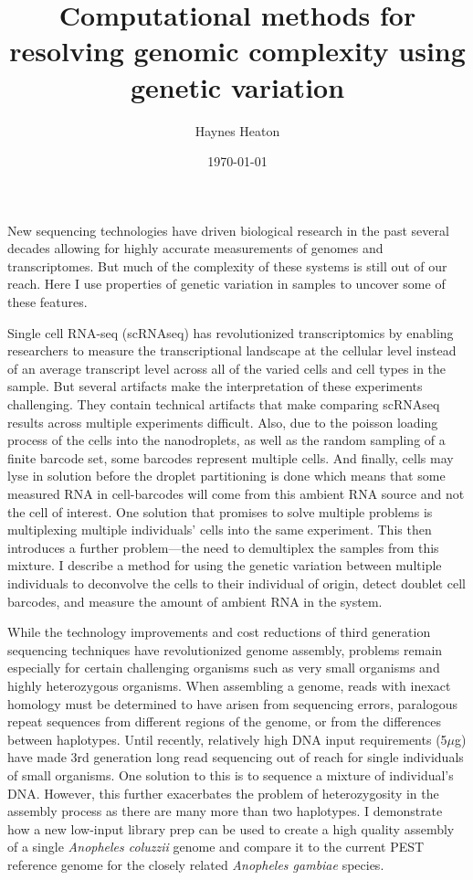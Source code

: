\documentclass[11pt]{article}
\title{Computational methods for resolving genomic complexity using genetic variation}
\author{
        Haynes Heaton
}
\date{\today}
\begin{document}
\maketitle

\par{
New sequencing technologies have driven biological research in the past several decades allowing for highly accurate measurements of genomes and transcriptomes. But much of the complexity of these systems is still out of our reach. Here I use properties of genetic variation in samples to uncover some of these features.
} 
\par{
Single cell RNA-seq (scRNAseq) has revolutionized transcriptomics by enabling researchers to measure the transcriptional landscape at the cellular level instead of an average transcript level across all of the varied cells and cell types in the sample. But several artifacts make the interpretation of these experiments challenging. They contain technical artifacts that make comparing scRNAseq results across multiple experiments difficult. Also, due to the poisson loading process of the cells into the nanodroplets, as well as the random sampling of a finite barcode set, some barcodes represent multiple cells. And finally, cells may lyse in solution before the droplet partitioning is done which means that some measured RNA in cell-barcodes will come from this ambient RNA source and not the cell of interest. One solution that promises to solve multiple problems is multiplexing multiple individuals' cells into the same experiment. This then introduces a further problem---the need to demultiplex the samples from this mixture. I describe a method for using the genetic variation between multiple individuals to deconvolve the cells to their individual of origin, detect doublet cell barcodes, and measure the amount of ambient RNA in the system. 

}
\par{
While the technology improvements and cost reductions of third generation sequencing techniques have revolutionized genome assembly, problems remain especially for certain challenging organisms such as very small organisms and highly heterozygous organisms. When assembling a genome, reads with inexact homology must be determined to have arisen from sequencing errors, paralogous repeat sequences from different regions of the genome, or from the differences between haplotypes. Until recently, relatively high DNA input requirements (5$\mu$g) have made 3rd generation long read sequencing out of reach for single individuals of small organisms. One solution to this is to sequence a mixture of individual's DNA. However, this further exacerbates the problem of heterozygosity in the assembly process as there are many more than two haplotypes. I demonstrate how a new low-input library prep can be used to create a high quality assembly of a single \textit{Anopheles coluzzii} genome and compare it to the current PEST reference genome for the closely related \textit{Anopheles gambiae} species.
}
\end{document}
